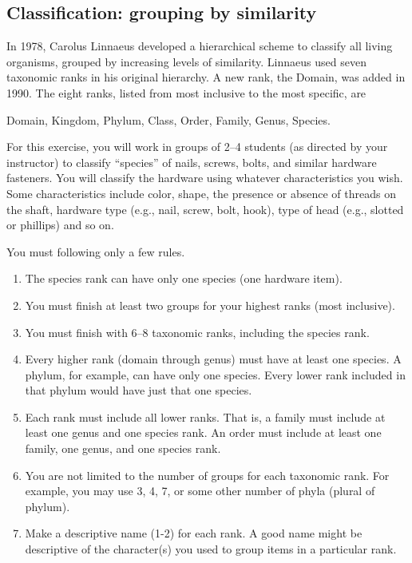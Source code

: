 \documentclass[12pt]{exam}
\newlength{\myindent}
\newcommand{\ind}{\hspace*{\myindent}}
\begin{document}
\subsection*{Classification: grouping by similarity }

In 1978, Carolus Linnaeus developed a hierarchical scheme to classify all living organisms, grouped by increasing levels of similarity. Linnaeus used seven taxonomic ranks in his original hierarchy. A new rank, the Domain, was added in 1990.  The eight ranks, listed from most inclusive to the most specific, are

\ind Domain, Kingdom, Phylum, Class, Order, Family, Genus, Species.

For this exercise, you will work in groups of 2–4 students (as directed by your instructor) to classify “species” of nails, screws, bolts, and similar hardware fasteners. You will classify the hardware using whatever characteristics you wish. Some characteristics include color, shape, the presence or absence of threads on the shaft, hardware type (e.g., nail, screw, bolt, hook), type of head (e.g., slotted or phillips) and so on. 

You must following only a few rules.

\begin{enumerate}

	\item The species rank can have only one species (one hardware item). 
	
	\item You must finish at least two groups for your highest ranks (most inclusive).
	
	\item You must finish with 6–8 taxonomic ranks, including the species rank.
	
	\item Every higher rank (domain through genus) must have at least one species. A phylum, for example, can have only one species. Every lower rank included in that phylum would have just that one species.
	
	\item Each rank must include all lower ranks. That is, a family must include at least one genus and one species rank. An order must include at least one family, one genus, and one species rank.
	
	\item You are not limited to the number of groups for each taxonomic rank. For example, you may use 3, 4, 7, or some other number of  phyla (plural of phylum).
	
	\item Make a descriptive name (1-2) for each rank. A good name might be descriptive of the character(s) you used to group items in a particular rank.

\end{enumerate}
\end{document}
